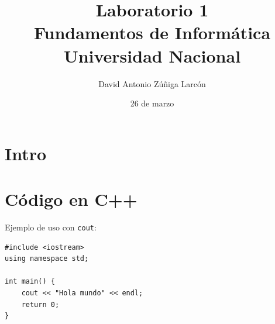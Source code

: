 \documentclass[12pt]{article}
\title{Laboratorio 1 \\ Fundamentos de Informática \\ Universidad Nacional}
\author{David Antonio Zúñiga Larcón}
\date{26 de marzo}
\begin{document}

\section{Intro}


\section{Código en C++}

Ejemplo de uso con \verb|cout|:

\begin{verbatim}
#include <iostream>
using namespace std;

int main() {
    cout << "Hola mundo" << endl;
    return 0;
}
\end{verbatim}

\section{}


\section{}
\end{document}
